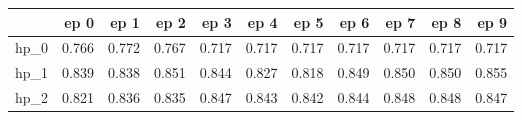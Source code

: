 \begin{tabular}{lrrrrrrrrrr}
\toprule
{} &   ep 0 &   ep 1 &   ep 2 &   ep 3 &   ep 4 &   ep 5 &   ep 6 &   ep 7 &   ep 8 &   ep 9 \\
\midrule
hp\_0 &  0.766 &  0.772 &  0.767 &  0.717 &  0.717 &  0.717 &  0.717 &  0.717 &  0.717 &  0.717 \\
hp\_1 &  0.839 &  0.838 &  0.851 &  0.844 &  0.827 &  0.818 &  0.849 &  0.850 &  0.850 &  0.855 \\
hp\_2 &  0.821 &  0.836 &  0.835 &  0.847 &  0.843 &  0.842 &  0.844 &  0.848 &  0.848 &  0.847 \\
\bottomrule
\end{tabular}
